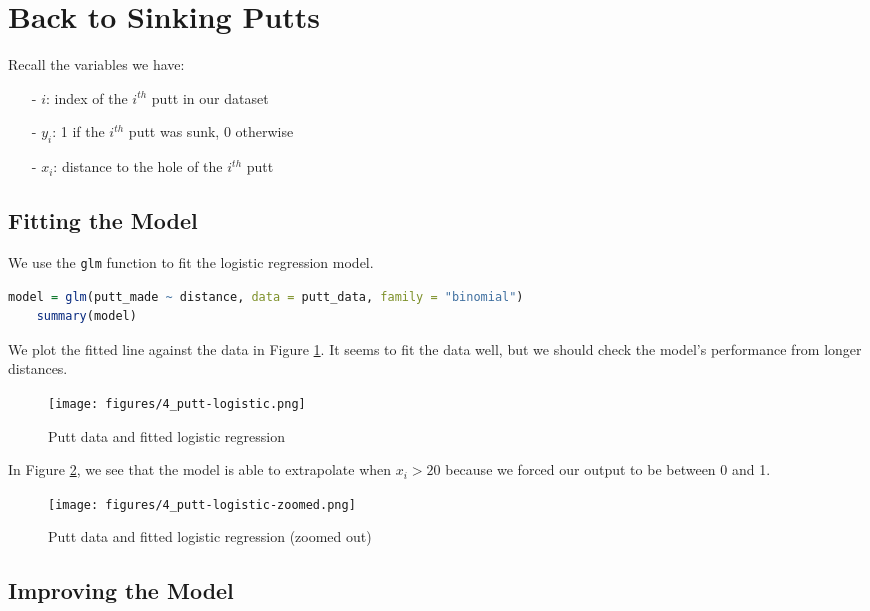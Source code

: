 \documentclass[twoside]{article}
\theoremstyle{definition}
\begin{document}
\section{Back to Sinking Putts}

Recall the variables we have:
\begin{itemize}
    \item[-] $i$: index of the $i^{th}$ putt in our dataset
    \item[-] $y_i$: 1 if the $i^{th}$ putt was sunk, 0 otherwise
    \item[-] $x_i$: distance to the hole of the $i^{th}$ putt
\end{itemize}

\subsection{Fitting the Model}

We use the \texttt{glm} function to fit the logistic regression model.
\begin{lstlisting}[language=R]
    model = glm(putt_made ~ distance, data = putt_data, family = "binomial")
    summary(model)
\end{lstlisting}
We plot the fitted line against the data in Figure \ref{fig:putt-logistic}. It seems to fit the data well, but we should check the model's performance from longer distances.

\begin{figure}[H]
    \centering
    \texttt{[image: figures/4\_putt-logistic.png]}
    \caption{Putt data and fitted logistic regression}
    \label{fig:putt-logistic}
\end{figure}
In Figure \ref{fig:putt-logistic-zoomed}, we see that the model is able to extrapolate when $x_i > 20$ because we forced our output to be between 0 and 1.
\begin{figure}[H]
    \centering
    \texttt{[image: figures/4\_putt-logistic-zoomed.png]}
    \caption{Putt data and fitted logistic regression (zoomed out)}
    \label{fig:putt-logistic-zoomed}
\end{figure}
\subsection{Improving the Model}
\end{document}
